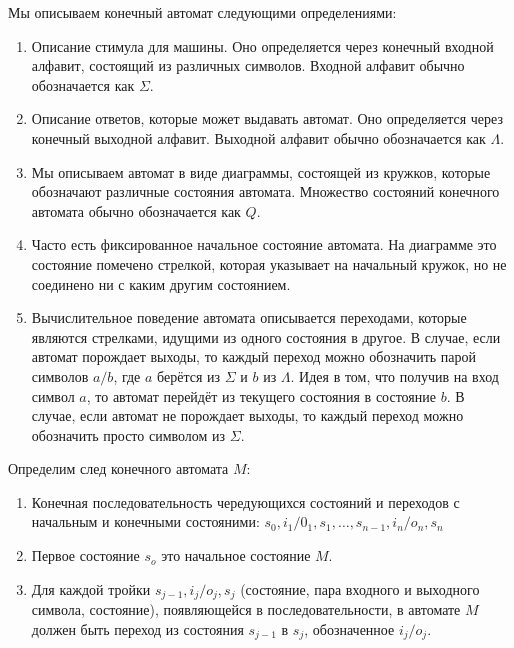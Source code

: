 
Мы описываем конечный автомат следующими определениями: \\

\begin{enumerate}
  \item Описание стимула для машины. Оно определяется через конечный входной алфавит, состоящий из различных символов. Входной алфавит обычно обозначается как $\Sigma$.
  \item Описание ответов, которые может выдавать автомат. Оно определяется через конечный выходной алфавит. Выходной алфавит обычно обозначается как $\Lambda$.
  \item Мы описываем автомат в виде диаграммы, состоящей из кружков, которые обозначают различные состояния автомата. Множество состояний конечного автомата обычно обозначается как $Q$.
  \item Часто есть фиксированное начальное состояние автомата. На диаграмме это состояние помечено стрелкой, которая указывает на начальный кружок, но не соединено ни с каким другим состоянием.
  \item Вычислительное поведение автомата описывается переходами, которые являются стрелками, идущими из одного состояния в другое. В случае, если автомат порождает выходы, то каждый переход можно обозначить парой символов $a/b$, где $a$ берётся из $\Sigma$ и $b$ из $\Lambda$. Идея в том, что получив на вход символ $a$, то автомат перейдёт из текущего состояния в состояние $b$. В случае, если автомат не порождает выходы, то каждый переход можно обозначить просто символом из $\Sigma$.
\end{enumerate}


Определим след конечного автомата $M$: \\

\begin{enumerate}
  \item Конечная последовательность чередующихся состояний и переходов с начальным и конечными состояними: $s_0, i_1/0_1, s_1, \ldots, s_{n-1}, i_n/o_n, s_n$
  \item Первое состояние $s_o$ это начальное состояние $M$.
  \item Для каждой тройки $s_{j-1}, i_j/o_j, s_j$ (состояние, пара входного и выходного символа, состояние), появляющейся в последовательности, в автомате $M$ должен быть переход из состояния $s_{j-1}$ в $s_j$, обозначенное $i_j/o_j$.
\end{enumerate}

